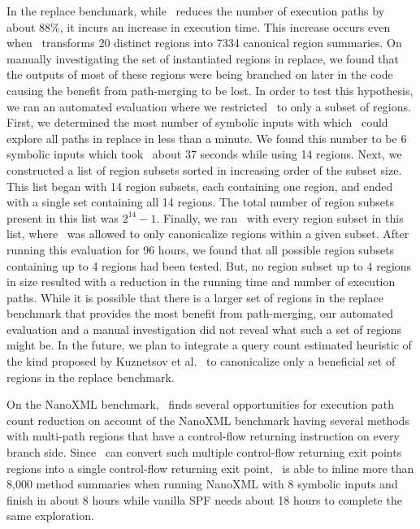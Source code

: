 In the replace benchmark, while \tool\ reduces the number of execution paths by about 88\%, it incurs an increase in
execution time.
%
This increase occurs even when \tool\ transforms 20 distinct regions into 7334 canonical region summaries.
%
On manually investigating the set of instantiated regions in replace, we found that the outputs of most of these
regions were being branched on later in the code causing the benefit from path-merging to be lost.
%
In order to test this hypothesis, we ran an automated evaluation where we restricted \tool\ to only a subset of
regions.
%
First, we determined the most number of symbolic inputs with which \tool\ could explore all paths in replace in less
than a minute.
%
We found this number to be 6 symbolic inputs which took \tool\ about 37 seconds while using 14 regions.
%
Next, we constructed a list of region subsets sorted in increasing order of the subset size.
%
This list began with 14 region subsets, each containing one region, and ended with a single set containing all 14 regions.
%
The total number of region subsets present in this list was $2^{14}-1$.
%
Finally, we ran \tool\ with every region subset in this list, where \tool\ was allowed to only canonicalize regions
within a given subset.
%
After running this evaluation for 96 hours, we found that all possible region subsets containing up to 4 regions had
been tested.
%
But, no region subset up to 4 regions in size resulted with a reduction in the running time and number of execution
paths.
%
While it is possible that there is a larger set of regions in the replace benchmark that provides the most benefit
from path-merging, our automated evaluation and a manual investigation did not reveal what such a set of regions might be.
%
In the future, we plan to integrate a query count estimated heuristic of the kind proposed by
Kuznetsov et al.~\cite{kuznetsov} to canonicalize only a beneficial set of regions in the replace benchmark.

On the NanoXML benchmark, \tool\ finds several opportunities for execution path count reduction on account of the
NanoXML benchmark having several methods with multi-path regions that have a control-flow returning instruction on every
branch side.
%
Since \tool\ can convert such multiple control-flow returning exit points regions into a single control-flow
returning exit point, \tool\ is able to inline more than 8,000 method summaries when running NanoXML with 8 symbolic
inputs and finish in about 8 hours while vanilla SPF needs about 18 hours to complete the same exploration.

